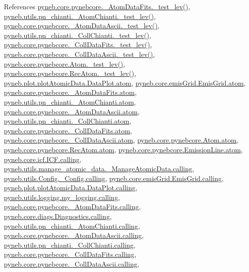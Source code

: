 References \hyperlink{pynebcore_8py_source_l00171}{pyneb.\+core.\+pynebcore.\+\_\+\+Atom\+Data\+Fits.\+\_\+test\+\_\+lev()}, \hyperlink{pn__chianti_8py_source_l00284}{pyneb.\+utils.\+pn\+\_\+chianti.\+\_\+\+Atom\+Chianti.\+\_\+test\+\_\+lev()}, \hyperlink{pynebcore_8py_source_l00435}{pyneb.\+core.\+pynebcore.\+\_\+\+Atom\+Data\+Ascii.\+\_\+test\+\_\+lev()}, \hyperlink{pn__chianti_8py_source_l00449}{pyneb.\+utils.\+pn\+\_\+chianti.\+\_\+\+Coll\+Chianti.\+\_\+test\+\_\+lev()}, \hyperlink{pynebcore_8py_source_l00660}{pyneb.\+core.\+pynebcore.\+\_\+\+Coll\+Data\+Fits.\+\_\+test\+\_\+lev()}, \hyperlink{pynebcore_8py_source_l01026}{pyneb.\+core.\+pynebcore.\+\_\+\+Coll\+Data\+Ascii.\+\_\+test\+\_\+lev()}, \hyperlink{pynebcore_8py_source_l01459}{pyneb.\+core.\+pynebcore.\+Atom.\+\_\+test\+\_\+lev()}, \hyperlink{pynebcore_8py_source_l02596}{pyneb.\+core.\+pynebcore.\+Rec\+Atom.\+\_\+test\+\_\+lev()}, \hyperlink{plot_atomic_data_8py_source_l00044}{pyneb.\+plot.\+plot\+Atomic\+Data.\+Data\+Plot.\+atom}, \hyperlink{emis_grid_8py_source_l00048}{pyneb.\+core.\+emis\+Grid.\+Emis\+Grid.\+atom}, \hyperlink{pynebcore_8py_source_l00082}{pyneb.\+core.\+pynebcore.\+\_\+\+Atom\+Data\+Fits.\+atom}, \hyperlink{pn__chianti_8py_source_l00214}{pyneb.\+utils.\+pn\+\_\+chianti.\+\_\+\+Atom\+Chianti.\+atom}, \hyperlink{pynebcore_8py_source_l00303}{pyneb.\+core.\+pynebcore.\+\_\+\+Atom\+Data\+Ascii.\+atom}, \hyperlink{pn__chianti_8py_source_l00405}{pyneb.\+utils.\+pn\+\_\+chianti.\+\_\+\+Coll\+Chianti.\+atom}, \hyperlink{pynebcore_8py_source_l00559}{pyneb.\+core.\+pynebcore.\+\_\+\+Coll\+Data\+Fits.\+atom}, \hyperlink{pynebcore_8py_source_l00909}{pyneb.\+core.\+pynebcore.\+\_\+\+Coll\+Data\+Ascii.\+atom}, \hyperlink{pynebcore_8py_source_l01164}{pyneb.\+core.\+pynebcore.\+Atom.\+atom}, \hyperlink{pynebcore_8py_source_l02564}{pyneb.\+core.\+pynebcore.\+Rec\+Atom.\+atom}, \hyperlink{pynebcore_8py_source_l03269}{pyneb.\+core.\+pynebcore.\+Emission\+Line.\+atom}, \hyperlink{icf_8py_source_l00016}{pyneb.\+core.\+icf.\+I\+C\+F.\+calling}, \hyperlink{manage__atomic__data_8py_source_l00018}{pyneb.\+utils.\+manage\+\_\+atomic\+\_\+data.\+\_\+\+Manage\+Atomic\+Data.\+calling}, \hyperlink{_config_8py_source_l00032}{pyneb.\+utils.\+Config.\+\_\+\+Config.\+calling}, \hyperlink{emis_grid_8py_source_l00041}{pyneb.\+core.\+emis\+Grid.\+Emis\+Grid.\+calling}, \hyperlink{plot_atomic_data_8py_source_l00042}{pyneb.\+plot.\+plot\+Atomic\+Data.\+Data\+Plot.\+calling}, \hyperlink{logging_8py_source_l00044}{pyneb.\+utils.\+logging.\+my\+\_\+logging.\+calling}, \hyperlink{pynebcore_8py_source_l00090}{pyneb.\+core.\+pynebcore.\+\_\+\+Atom\+Data\+Fits.\+calling}, \hyperlink{diags_8py_source_l00169}{pyneb.\+core.\+diags.\+Diagnostics.\+calling}, \hyperlink{pn__chianti_8py_source_l00223}{pyneb.\+utils.\+pn\+\_\+chianti.\+\_\+\+Atom\+Chianti.\+calling}, \hyperlink{pynebcore_8py_source_l00311}{pyneb.\+core.\+pynebcore.\+\_\+\+Atom\+Data\+Ascii.\+calling}, \hyperlink{pn__chianti_8py_source_l00414}{pyneb.\+utils.\+pn\+\_\+chianti.\+\_\+\+Coll\+Chianti.\+calling}, \hyperlink{pynebcore_8py_source_l00568}{pyneb.\+core.\+pynebcore.\+\_\+\+Coll\+Data\+Fits.\+calling}, \hyperlink{pynebcore_8py_source_l00918}{pyneb.\+core.\+pynebcore.\+\_\+\+Coll\+Data\+Ascii.\+calling}, 